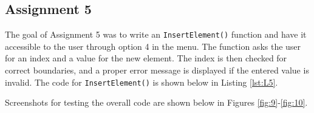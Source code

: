 \documentclass[
	letterpaper, %
	10pt, %
]{CSUniSchoolLabReport}
\begin{document}
  \subsection{Assignment 5} \hspace{.5 in} The goal of Assignment 5 was to write an \texttt{InsertElement()} function and have it accessible to the user through option 4 in the menu. The function asks the user for an index and a value for the new element. The index is then checked for correct boundaries, and a proper error message is displayed if the entered value is invalid. The code for \texttt{InsertElement()} is shown below in Listing \ref{lst:L5}.



Screenshots for testing the overall code are shown below in Figures \ref{fig:9}-\ref{fig:10}.
\end{document}
